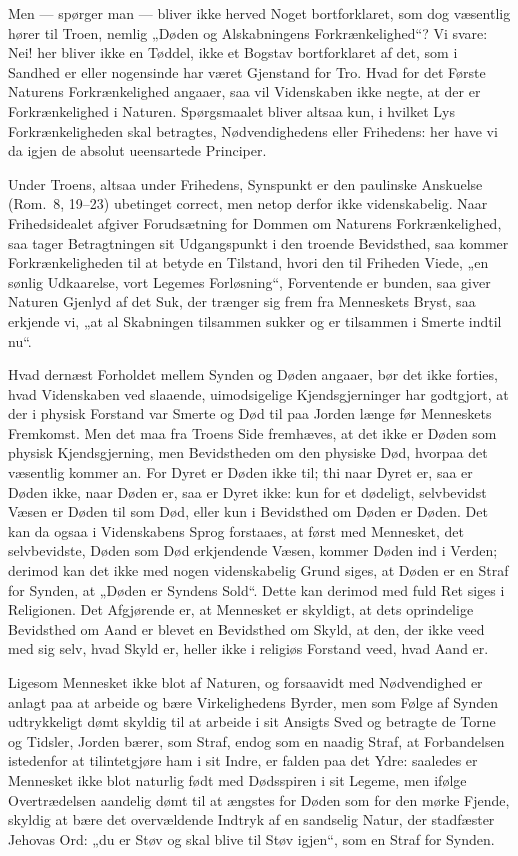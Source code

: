 \documentclass[12pt]{book}
\begin{document}
Men --- spørger man --- bliver ikke herved Noget bortforklaret, som
dog væsentlig hører til Troen, nemlig „Døden og Alskabningens
Forkrænkelighed“? Vi svare: Nei! her bliver ikke en Tøddel, ikke et
Bogstav bortforklaret af det, som i Sandhed er eller nogensinde har
været Gjenstand for Tro. Hvad for det Første Naturens
Forkrænkelighed angaaer, saa vil Videnskaben ikke negte, at der er
Forkrænkelighed i Naturen. Spørgsmaalet bliver altsaa kun, i hvilket
Lys Forkrænkeligheden skal
betragtes, Nødvendighedens eller Frihedens: her have vi da igjen de
absolut ueensartede Principer.

Under Troens, altsaa under Frihedens, Synspunkt er den paulinske
Anskuelse (Rom.\ 8, 19--23) ubetinget correct, men netop derfor ikke
videnskabelig. Naar Frihedsidealet afgiver Forudsætning for Dommen
om Naturens Forkrænkelighed, saa tager Betragtningen sit
Udgangspunkt i den troende Bevidsthed, saa kommer Forkrænkeligheden
til at betyde en Tilstand, hvori den til Friheden Viede, „en sønlig
Udkaarelse, vort Legemes Forløsning“, Forventende er bunden, saa
giver Naturen Gjenlyd af det Suk, der trænger sig frem fra
Menneskets Bryst, saa erkjende vi, „at al Skabningen tilsammen
sukker og er tilsammen i Smerte indtil nu“.

Hvad dernæst Forholdet mellem Synden og Døden angaaer, bør det ikke
forties, hvad Videnskaben ved slaaende, uimodsigelige
Kjendsgjerninger har godtgjort, at der i physisk Forstand var Smerte
og Død til paa Jorden længe før Menneskets Fremkomst. Men det maa
fra Troens Side fremhæves, at det ikke er Døden som physisk
Kjendsgjerning, men Bevidstheden om den physiske Død, hvorpaa det
væsentlig kommer an. For Dyret er Døden ikke til; thi naar Dyret er,
saa er Døden ikke, naar Døden er, saa er Dyret ikke: kun for et
dødeligt, selvbevidst Væsen er Døden til som Død, eller kun i
Bevidsthed om Døden er Døden. Det kan da ogsaa i Videnskabens Sprog
forstaaes, at først med Mennesket, det selvbevidste, Døden som Død
erkjendende Væsen, kommer Døden ind i Verden; derimod kan det ikke
med nogen videnskabelig Grund siges, at Døden er en Straf for
Synden, at „Døden er Syndens Sold“. Dette kan derimod med fuld Ret
siges i Religionen. Det Afgjørende er, at Mennesket er skyldigt, at
dets oprindelige Bevidsthed om Aand er blevet en Bevidsthed om
Skyld,
at den, der ikke veed med sig selv, hvad Skyld er, heller ikke i
religiøs Forstand veed, hvad Aand er.

Ligesom Mennesket ikke blot af Naturen, og forsaavidt med
Nødvendighed er anlagt paa at arbeide og bære Virkelighedens Byrder,
men som Følge af Synden udtrykkeligt dømt skyldig til at arbeide i
sit Ansigts Sved og betragte de Torne og Tidsler, Jorden bærer, som
Straf, endog som en naadig Straf, at Forbandelsen istedenfor at
tilintetgjøre ham i sit Indre, er falden paa det Ydre: saaledes er
Mennesket ikke blot naturlig født med Dødsspiren i sit Legeme, men
ifølge Overtrædelsen aandelig dømt til at ængstes for Døden som for
den mørke Fjende, skyldig at bære det overvældende Indtryk af en
sandselig Natur, der stadfæster Jehovas Ord: „du er Støv og skal
blive til Støv igjen“, som en Straf for Synden.
\end{document}
